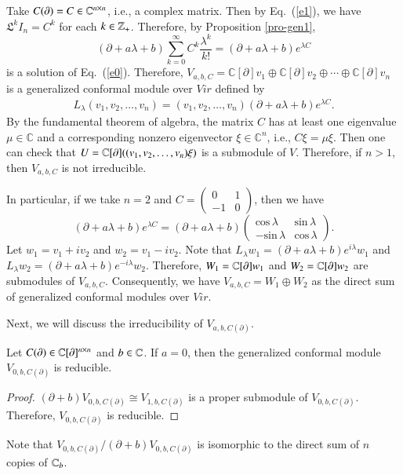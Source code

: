 \documentclass[12pt]{amsart}
\begin{document}
\begin{ex}
Take $C(\partial)=C\in\mathbb{C}^{n\times n}$, i.e., a complex matrix.
Then by Eq.~(\ref{e1}), we have $\mathfrak{L}^kI_n=C^k$ for each $k\in \mathbb{Z}_+$. Therefore, by Proposition \ref{pro-gen1},
$$(\partial+a \lambda+b)\sum_{k=0}^\infty C^k\frac{\lambda^k}{k!}=(\partial+a \lambda+b)e^{\lambda C}$$
is a solution of Eq.~(\ref{e0}). Therefore, $V_{a,b,C} = \mathbb{C}[\partial]v_1\oplus \mathbb{C}[\partial]v_2\oplus \cdots \oplus \mathbb{C}[\partial]v_n$ is a generalized conformal module over $Vir$ defined by
\begin{eqnarray*}
L_\lambda (v_1, v_2, \ldots, v_n)=(v_1, v_2, \ldots, v_n)(\partial + a\lambda + b)e^{\lambda C}.
\end{eqnarray*}
By the fundamental theorem of algebra, the matrix $C$ has at least one eigenvalue $\mu \in \mathbb{C}$ and a corresponding nonzero eigenvector
$\xi \in \mathbb{C}^n$, i.e., $C \xi = \mu \xi$.  Then one can check that $U=\mathbb{C}[\partial] ((v_1, v_2, \ldots, v_n)\xi)$ is a submodule of $V$. Therefore, if $n>1$, then $V_{a,b,C}$ is not irreducible.


In particular, if we take $n=2$ and $C=
\begin{pmatrix}0&1\\
-1&0
\end{pmatrix}$, then we have $$(\partial+a \lambda+b)e^{\lambda C}=(\partial+a \lambda+b)\begin{pmatrix} \text{cos}\, \lambda &\text{sin}\, \lambda\\
-\text{sin}\, \lambda &\text{cos}\, \lambda
\end{pmatrix}.$$
Let $w_1=v_1+iv_2$ and $w_2=v_1-iv_2$. Note that $L_\lambda w_1=(\partial+a\lambda+b)e^{i\lambda}w_1$ and $L_\lambda w_2=(\partial+a\lambda+b)e^{-i\lambda}w_2$. Therefore, $W_1=\mathbb{C}[\partial]w_1$ and $W_2=\mathbb{C}[\partial]w_2$ are submodules of $V_{a,b,C}$. Consequently, we have $V_{a,b,C}=W_1\oplus W_2$ as the direct sum of generalized conformal modules over $Vir$.
\end{ex}

Next, we will discuss the irreducibility of $V_{a,b,C(\partial)}$.

\begin{pro}\label{pro-irr1}
Let $C(\partial)\in \mathbb{C}[\partial]^{n\times n}$ and $b\in \mathbb{C}$. If $a=0$, then the generalized conformal module $V_{0,b,C(\partial)}$ is reducible.
\end{pro}
\begin{proof}
  $(\partial+b)V_{0,b,C(\partial)}\cong V_{1,b,C(\partial)}$ is a proper submodule of $V_{0,b,C(\partial)}$. Therefore, $V_{0,b,C(\partial)}$ is reducible.
\end{proof}
\begin{rmk}
Note that $V_{0,b,C(\partial)}/(\partial+b)V_{0,b,C(\partial)}$ is isomorphic to the direct sum of $n$ copies of $\mathbb{C}_b$.
\end{rmk}
\end{document}
